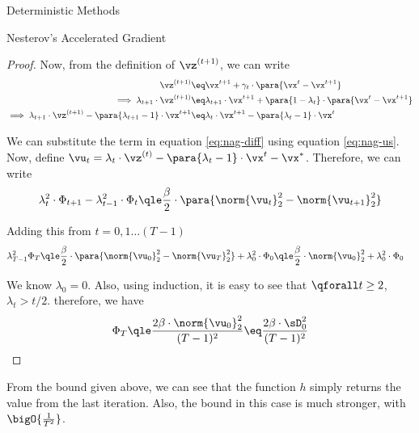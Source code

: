 \documentclass{article}
\begin{document}
\begin{psection}{Deterministic Methods}
\begin{psubsection}{Nesterov's Accelerated Gradient}
\begin{theorem}
\begin{proof}
			Now, from the definition of $\z{t + 1}$, we can write
			\begin{align}
				\z{t + 1}	&\eq	\x{t + 1} + \gamma_t \cdot \para{\x{t} - \x{t + 1}} \nonumber \\
				\implies \lambda_{t + 1} \cdot \z{t + 1}	&\eq	\lambda_{t + 1} \cdot \x{t + 1} + \para{1 - \lambda_t} \cdot \para{\x{t } - \x{t + 1}} \nonumber \\
				\implies \lambda_{t + 1} \cdot \z{t + 1} - \para{\lambda_{t + 1} - 1} \cdot \x{t + 1}	&\eq	\lambda_t \cdot \x{t + 1} - \para{\lambda_t - 1} \cdot \x{t} \label{eq:nag-us}
			\end{align}

			We can substitute the term in equation \ref{eq:nag-diff} using equation \ref{eq:nag-us}. Now, define $\vu_t = \lambda_t \cdot \z{t} - \para{\lambda_t - 1} \cdot \x{t} - \xs$. Therefore, we can write
			\begin{align*}
				\lambda_t^2 \cdot \Phi_{t + 1} - \lambda_{t - 1}^2 \cdot \Phi_{t}	\qle	\frac{\beta}{2} \cdot \para{\norm{\vu_t}_2^2 - \norm{\vu_{t + 1}}_2^2}
			\end{align*}

			Adding this from $t = 0, 1 \dots (T - 1)$
			\begin{align*}
				\lambda_{T - 1}^2 \Phi_{T}	&\qle	\frac{\beta}{2} \cdot \para{\norm{\vu_0}_2^2 - \norm{\vu_T}_2^2} + \lambda_{0}^2 \cdot \Phi_{0}	\qle	\frac{\beta}{2} \cdot \norm{\vu_0}_2^2 + \lambda_0^2 \cdot \Phi_0
			\end{align*}

			We know $\lambda_0 = 0$. Also, using induction, it is easy to see that $\qforall t \ge 2$, $\lambda_{t} > t / 2$. therefore, we have
			\begin{align*}
				\Phi_T	\qle	\frac{2 \beta \cdot \norm{\vu_0}_2^2}{(T - 1)^2}	\eq	\frac{2 \beta \cdot \sD_0^2}{(T - 1)^2}
			\end{align*}
		\end{proof}
	\end{theorem}

	From the bound given above, we can see that the function $h$ simply returns the value from the last iteration. Also, the bound in this case is much stronger, with $\bigO{\frac{1}{T^2}}$.

\end{psubsection}

\end{psection}
\end{document}
